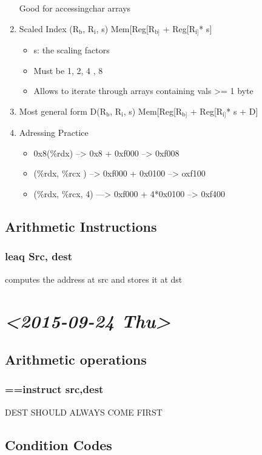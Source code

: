\documentclass[11pt]{article}
\begin{document}
\begin{enumerate}
Good for accessingchar arrays
\item Scaled Index (R$_{\text{b}}$, R$_{\text{i}}$, s) Mem[Reg[R$_{\text{b]}}$ + Reg[R$_{\text{i]}}$* s]
\label{sec-6-1-3-4}
\begin{itemize}
\item s: the scaling factors
\item Must be 1, 2, 4 , 8
\item Allows to iterate through arrays containing vals >= 1 byte
\end{itemize}
\item Most general form D(R$_{\text{b}}$, R$_{\text{i}}$, s) Mem[Reg[R$_{\text{b]}}$ + Reg[R$_{\text{i]}}$* s + D]
\label{sec-6-1-3-5}
\item Adressing Practice
\label{sec-6-1-3-6}
\begin{itemize}
\item 0x8(\%rdx) --> 0x8 + 0xf000 --> 0xf008
\item (\%rdx, \%rcx ) --> 0xf000 + 0x0100 --> oxf100
\item (\%rdx, \%rcx, 4) ---> 0xf000 + 4*0x0100 --> 0xf400
\end{itemize}
\end{enumerate}
\subsection{Arithmetic Instructions}
\label{sec-6-2}
\subsubsection{leaq Src, dest}
\label{sec-6-2-1}
computes the address at src and stores it at dst

\section{\textit{<2015-09-24 Thu>}}
\label{sec-7}
\subsection{Arithmetic operations}
\label{sec-7-1}
\subsubsection{==instruct src,dest}
\label{sec-7-1-1}
DEST SHOULD ALWAYS COME FIRST
\subsection{Condition Codes}
\label{sec-7-2}
\end{document}
